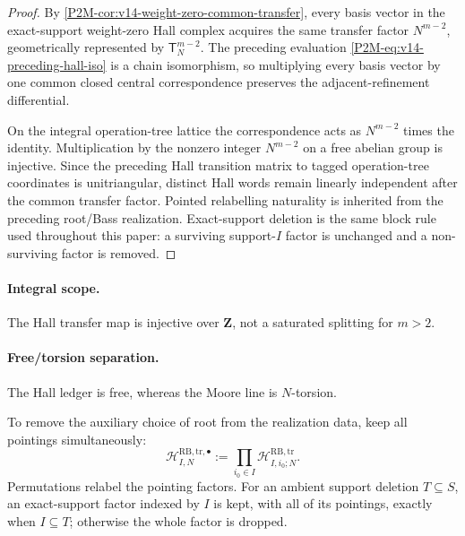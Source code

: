 \documentclass[11pt]{article}
\theoremstyle{remark}
\newcommand{\Z}{\mathbf Z}
\begin{document}
\begin{proof}
By \cref{P2M-cor:v14-weight-zero-common-transfer}, every basis vector in the
exact-support weight-zero Hall complex acquires the same transfer factor
$N^{m-2}$, geometrically represented by $\mathsf T_N^{m-2}$.  The preceding evaluation
\eqref{P2M-eq:v14-preceding-hall-iso} is a chain isomorphism, so multiplying every
basis vector by one common closed central correspondence preserves the
adjacent-refinement differential.

On the integral operation-tree lattice the correspondence acts as
$N^{m-2}$ times the identity.  Multiplication by the nonzero integer
$N^{m-2}$ on a free abelian group is injective.  Since the preceding Hall
transition matrix to tagged operation-tree coordinates is unitriangular,
distinct Hall words remain linearly independent after the common transfer
factor.  Pointed relabelling naturality is inherited from the preceding root/Bass
realization.  Exact-support deletion is the same block rule used throughout this paper: a surviving support-$I$ factor is unchanged and a non-surviving factor is removed.
\end{proof}

\paragraph{Integral scope.}
The Hall transfer map is injective over \(\Z\), not a saturated splitting for
\(m>2\).


\paragraph{Free/torsion separation.}
The Hall ledger is free, whereas the Moore line is \(N\)-torsion.


To remove the auxiliary choice of root from the realization data, keep all
pointings simultaneously:
\begin{equation}
 \boxed{
 \mathscr H_{I,N}^{\mathrm{RB,tr},\bullet}
 :=\prod_{i_0\in I}\mathscr H_{I,i_0;N}^{\mathrm{RB,tr}}.}
\end{equation}
Permutations relabel the pointing factors.  For an ambient support deletion $T\subseteq S$, an exact-support factor indexed by $I$ is kept, with all of its pointings, exactly when $I\subseteq T$; otherwise the whole factor is dropped.
\end{document}
